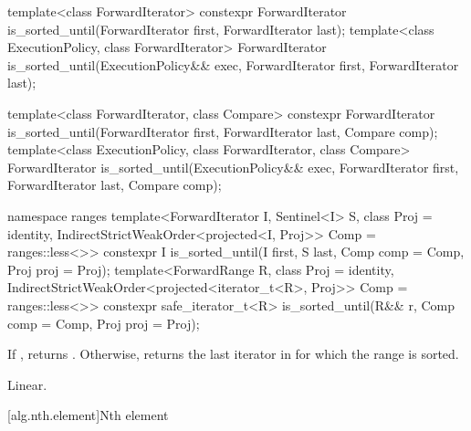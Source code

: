 %
\begin{itemdecl}
template<class ForwardIterator>
  constexpr ForwardIterator
    is_sorted_until(ForwardIterator first, ForwardIterator last);
template<class ExecutionPolicy, class ForwardIterator>
  ForwardIterator
    is_sorted_until(ExecutionPolicy&& exec,
                    ForwardIterator first, ForwardIterator last);

template<class ForwardIterator, class Compare>
  constexpr ForwardIterator
    is_sorted_until(ForwardIterator first, ForwardIterator last,
                    Compare comp);
template<class ExecutionPolicy, class ForwardIterator, class Compare>
  ForwardIterator
    is_sorted_until(ExecutionPolicy&& exec,
                    ForwardIterator first, ForwardIterator last,
                    Compare comp);
\end{itemdecl}
\begin{addedblock}
\begin{itemdecl}
namespace ranges {
  template<ForwardIterator I, Sentinel<I> S, class Proj = identity,
      IndirectStrictWeakOrder<projected<I, Proj>> Comp = ranges::less<>>
    constexpr I is_sorted_until(I first, S last, Comp comp = Comp{}, Proj proj = Proj{});
  template<ForwardRange R, class Proj = identity,
      IndirectStrictWeakOrder<projected<iterator_t<R>, Proj>> Comp = ranges::less<>>
    constexpr safe_iterator_t<R>
      is_sorted_until(R&& r, Comp comp = Comp{}, Proj proj = Proj{});
}
\end{itemdecl}
\end{addedblock}

\begin{itemdescr}
\pnum
\returns If , returns
. Otherwise, returns
the last iterator  in  for which the
range  is sorted.

\pnum
\complexity Linear.
\end{itemdescr}


[alg.nth.element]{Nth element}

